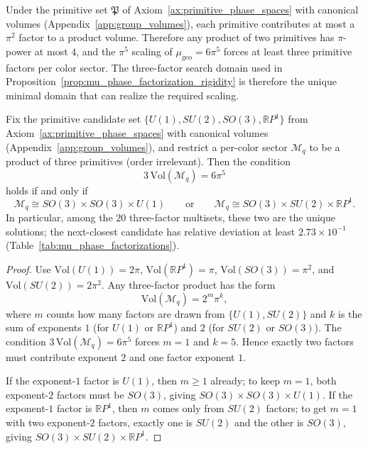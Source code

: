 \begin{remark}\label{rem:mu_min_factor_count}
Under the primitive set $\mathfrak{P}$ of Axiom~\ref{ax:primitive_phase_spaces} with canonical volumes (Appendix~\ref{app:group_volumes}), each primitive contributes at most a $\pi^2$ factor to a product volume. Therefore any product of two primitives has $\pi$-power at most $4$, and the $\pi^5$ scaling of $\mu_{\mathrm{geo}}=6\pi^5$ forces at least three primitive factors per color sector. The three-factor search domain used in Proposition~\ref{prop:mu_phase_factorization_rigidity} is therefore the unique minimal domain that can realize the required scaling.
\end{remark}

\begin{proposition}\label{prop:mu_phase_factorization_rigidity}
Fix the primitive candidate set $\{U(1),SU(2),SO(3),\mathbb{R}P^1\}$ from Axiom~\ref{ax:primitive_phase_spaces} with canonical volumes (Appendix~\ref{app:group_volumes}), and restrict a per-color sector $\mathcal{M}_q$ to be a product of three primitives (order irrelevant). Then the condition
\begin{equation}
3\,\mathrm{Vol}(\mathcal{M}_q)=6\pi^5
\end{equation}
holds if and only if
\begin{equation}
\mathcal{M}_q\cong SO(3)\times SO(3)\times U(1)
\qquad\text{or}\qquad
\mathcal{M}_q\cong SO(3)\times SU(2)\times \mathbb{R}P^1.
\end{equation}
In particular, among the $20$ three-factor multisets, these two are the unique solutions; the next-closest candidate has relative deviation at least $2.73\times 10^{-1}$ (Table~\ref{tab:mu_phase_factorizations}).
\end{proposition}
\begin{proof}
Use $\mathrm{Vol}(U(1))=2\pi$, $\mathrm{Vol}(\mathbb{R}P^1)=\pi$, $\mathrm{Vol}(SO(3))=\pi^2$, and $\mathrm{Vol}(SU(2))=2\pi^2$. Any three-factor product has the form
\[
\mathrm{Vol}(\mathcal{M}_q)=2^{m}\pi^{k},
\]
where $m$ counts how many factors are drawn from $\{U(1),SU(2)\}$ and $k$ is the sum of exponents $1$ (for $U(1)$ or $\mathbb{R}P^1$) and $2$ (for $SU(2)$ or $SO(3)$). The condition $3\,\mathrm{Vol}(\mathcal{M}_q)=6\pi^5$ forces $m=1$ and $k=5$. Hence exactly two factors must contribute exponent $2$ and one factor exponent $1$.

If the exponent-$1$ factor is $U(1)$, then $m\ge 1$ already; to keep $m=1$, both exponent-$2$ factors must be $SO(3)$, giving $SO(3)\times SO(3)\times U(1)$. If the exponent-$1$ factor is $\mathbb{R}P^1$, then $m$ comes only from $SU(2)$ factors; to get $m=1$ with two exponent-$2$ factors, exactly one is $SU(2)$ and the other is $SO(3)$, giving $SO(3)\times SU(2)\times \mathbb{R}P^1$.
\end{proof}

